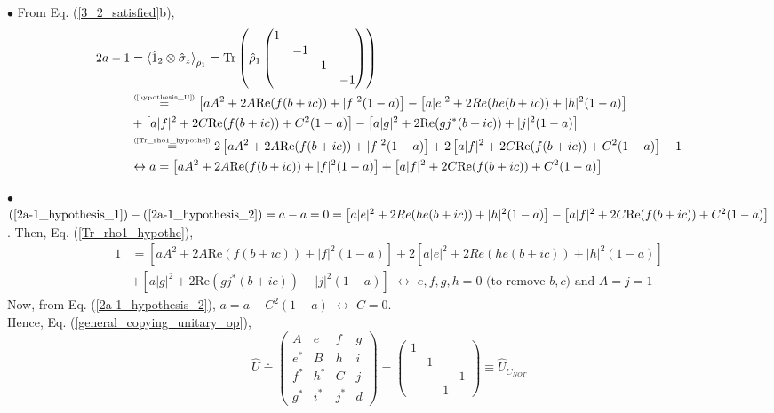 \documentclass[11pt]{article}
\numberwithin{equation}{section} %
\numberwithin{figure}{section} %
\newcommand\numeq[1] %
  {\stackrel{\scriptscriptstyle(\mkern-1.5mu#1\mkern-1.5mu)}{=}}
\begin{document}
\begin{appendices}
\noindent $\bullet$ From Eq. (\ref{3_2_satisfied}b),
\begin{equation} \label{2a-1_hypothesis_2}
\begin{split}
2a-1
&	=\braket{\hat{1}_2\otimes\hat{\sigma}_z}_{\hat{\rho}_1} =   \textrm{Tr}\left(\hat{\rho}_1\begin{pmatrix}1&&&\\ &-1&&\\ &&1&\\ &&&-1\end{pmatrix} \right)\\
&	\numeq{\textrm{\ref{hypothesis_U}}} \left[aA^2+2A\textrm{Re}(f(b+ic))+|f|^2(1-a)\right] - \left[a|e|^2+2Re(he(b+ic))+|h|^2(1-a)\right]\\
&	+\left[a|f|^2+2C\textrm{Re}(f(b+ic))+C^2(1-a)\right] -\left[a|g|^2+2\textrm{Re}(gj^*(b+ic))+|j|^2(1-a)\right]\\
&	\numeq{\textrm{\ref{Tr_rho1_hypothe}}} 2\left[aA^2+2A\textrm{Re}(f(b+ic))+|f|^2(1-a)\right] +2\left[a|f|^2+2C\textrm{Re}(f(b+ic))+C^2(1-a)\right]-1\\
&	\leftrightarrow a=\left[aA^2+2A\textrm{Re}(f(b+ic))+|f|^2(1-a)\right] +\left[a|f|^2+2C\textrm{Re}(f(b+ic))+C^2(1-a)\right]
\end{split} 
\end{equation}

\noindent $\bullet$ $(\textrm{\ref{2a-1_hypothesis_1}}) - (\textrm{\ref{2a-1_hypothesis_2}}) = a-a = 0 = \left[a|e|^2+2Re(he(b+ic))+|h|^2(1-a)\right] - \left[a|f|^2+2C\textrm{Re}(f(b+ic))+C^2(1-a)\right]$. Then, Eq. (\ref{Tr_rho1_hypothe}), 
\begin{equation}
\begin{split}
1
&=\left[aA^2+2A\textrm{Re}(f(b+ic))+|f|^2(1-a)\right] + 2\left[a|e|^2+2Re(he(b+ic))+|h|^2(1-a)\right]\\
&	+\left[a|g|^2+2\textrm{Re}(gj^*(b+ic))+|j|^2(1-a)\right] \,\,\leftrightarrow\,\, e,f,g,h=0\textrm{ (to remove $b,c$) and } A=j=1
\end{split}
\end{equation}
Now, from Eq. (\ref{2a-1_hypothesis_2}), $a=a-C^2(1-a)\,\,\leftrightarrow\,\, C=0$.\\

Hence, Eq. (\ref{general_copying_unitary_op}), 
\begin{equation} \label{U_CNOT_proof}
\hat{U}\doteq \begin{pmatrix} A&e&f&g\\ e^*&B&h&i\\ f^*&h^*&C&j\\ g^*&i^*&j^*&d\end{pmatrix}=\begin{pmatrix} 1&&&\\ &1&&\\ &&&1\\ &&1&\end{pmatrix}\equiv \hat{U}_{C_{NOT}}
\end{equation}






\end{appendices}
\end{document}
